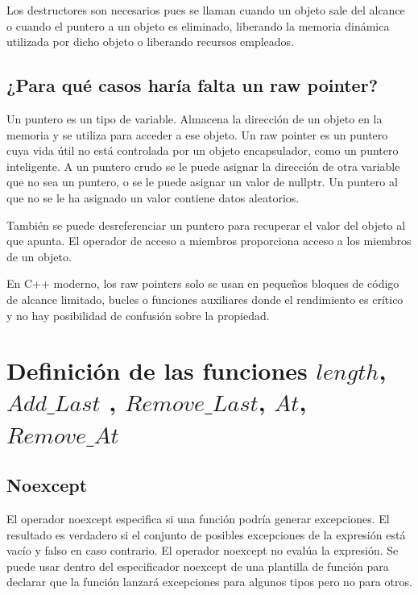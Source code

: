 \documentclass[10pt]{article}
\begin{document}
Los destructores son necesarios pues se llaman cuando un objeto sale del alcance o cuando el puntero a un objeto es eliminado, liberando la memoria dinámica utilizada por dicho objeto o liberando recursos empleados. 

\subsection{¿Para qué casos haría falta un raw pointer?}

Un puntero es un tipo de variable. Almacena la dirección de un objeto en la memoria y se utiliza para acceder a ese objeto. Un raw pointer es un puntero cuya vida útil no está controlada por un objeto encapsulador, como un puntero inteligente. A un puntero crudo se le puede asignar la dirección de otra variable que no sea un puntero, o se le puede asignar un valor de nullptr. Un puntero al que no se le ha asignado un valor contiene datos aleatorios.

También se puede desreferenciar un puntero para recuperar el valor del objeto al que apunta. El operador de acceso a miembros proporciona acceso a los miembros de un objeto.

En C++ moderno, los raw pointers solo se usan en pequeños bloques de código de alcance limitado, bucles o funciones auxiliares donde el rendimiento es crítico y no hay posibilidad de confusión sobre la propiedad.

\vspace{2em}
\section{Definici\'on de las funciones $ length $, $ Add\_Last $ , $ Remove\_Last $, $ At $, $ Remove\_At $}



\subsection{Noexcept}

El operador noexcept especifica si una función podría generar excepciones. El resultado es verdadero si el conjunto de posibles excepciones de la expresión está vacío y falso en caso contrario. El operador noexcept no evalúa la expresión. Se puede usar dentro del especificador noexcept de una plantilla de función para declarar que la función lanzará excepciones para algunos tipos pero no para otros.
\end{document}
